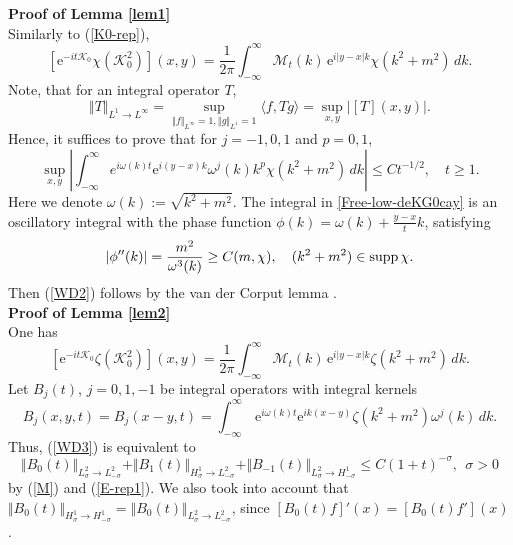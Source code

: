 \documentclass[reqno]{amsart}
\newcommand{\cK}{{\mathcal K}}
\newcommand{\E}{\mathrm{e}}
\numberwithin{equation}{section}
\begin{document}
{\bf Proof of Lemma \ref{lem1}}
\\
Similarly to (\ref{K0-rep}),
\[%
[\E^{-it\cK_0} \chi(\cK_0^2)](x,y)=\frac{1}{2\pi}\int_{-\infty}^{\infty}{\mathcal M}_t(k)\,
\E^{i|y-x|k}\chi(k^2+m^2)\,dk.
\]%
Note, that for an integral operator $T$,
\[
\Vert T\Vert_{L^1\to L^{\infty}}=\sup\limits_{\Vert f\Vert_{L^\infty}=1,\Vert g\Vert_{L^1}=1}
\langle f, Tg\rangle= \sup\limits_{x,y}|[T](x,y)|.
\]
Hence, it suffices to prove that for $j=-1,0,1$ and $p=0,1$,
\begin{equation}\label{Free-low-deKG0cay}
\sup\limits_{x,y}|\int_{-\infty}^{\infty}e^{i\omega(k)t}\E^{i(y-x)k}\omega^j(k)k^{p}\chi(k^2+m^2)\,dk|\le Ct^{-1/2},\quad t\ge 1.
\end{equation}
Here  we denote $\omega(k):=\sqrt{k^2+m^2}$. The integral in \eqref{Free-low-deKG0cay} is 
an oscillatory integral with the  phase function $\phi(k)=\omega(k)+\frac{y-x}{t }k$, satisfying
\[
|\phi''(k)|=\frac{m^2}{\omega^3(k)}\ge C (m,\chi),
\quad (k^2 + m^2)\in{\rm supp}\,\chi.
\]
Then (\ref{WD2}) follows by the  van der Corput lemma \cite [page 332] {St}.
\\
{\bf Proof of Lemma \ref{lem2}}
\\
One has
\begin{equation}\label{E-rep1}
[\E^{-it\cK_0} \zeta(\cK_0^2)](x,y)=\frac{1}{2\pi}\int_{-\infty}^{\infty}{\mathcal M}_t(k)\,
\E^{i|y-x|k}\zeta(k^2+m^2)\,dk.
\end{equation}
Let  $B_j(t)$, $j=0,1,-1$  be  integral  operators with  integral kernels
$$
B_j(x,y,t)=B_j(x-y,t)=\int_{-\infty}^{\infty}\,\E^{i\omega(k)t}\E^{ik(x-y)}\zeta(k^2+m^2)\omega^j(k)\,dk.
$$
Thus,  (\ref{WD3})  is equivalent to
\begin{equation}\label{bs2}
\Vert B_0(t)\Vert_{L^2_{\sigma}\to L^2_{-\sigma}}
+\Vert B_1(t)\Vert_{H^1_{\sigma}\to L^2_{-\sigma}}+\Vert B_{-1}(t)\Vert_{L^2_{\sigma}\to H^1_{-\sigma}}
\le C(1+ t)^{-\sigma}\!, ~~\sigma>0
\end{equation}
by (\ref{M}) and  (\ref{E-rep1}). We also took into account that  
$\Vert B_0(t)\Vert_{H^1_{\sigma}\to H^1_{-\sigma}} =\Vert B_0(t)\Vert_{L^2_{\sigma}\to L^2_{-\sigma}}$, since
$[B_0(t)f]'(x)= [B_0(t)f'](x)$. 
\end{document}
